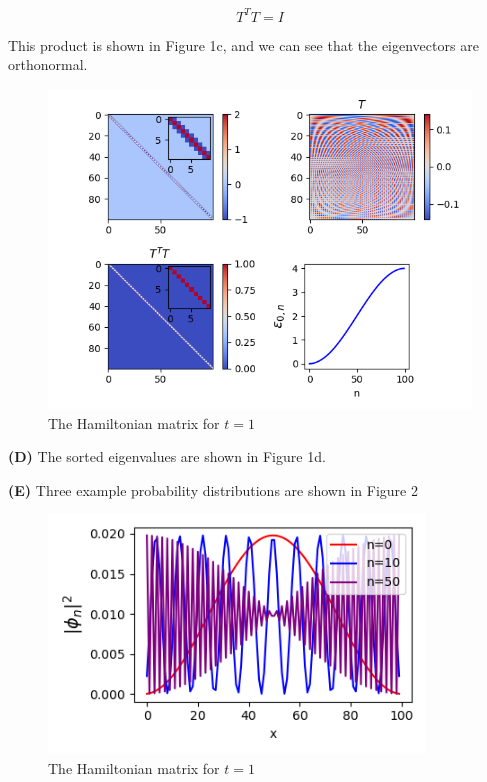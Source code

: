 \documentclass[12pt]{article}
\theoremstyle{definition}
\begin{document}
{\begin{equation*}
T^{T}T = I
\end{equation*}

This product is shown in Figure 1c, and we can see that the eigenvectors are orthonormal.

\begin{figure}[t!]
\centering
\includegraphics[width=15cm]{p1_1}
\caption{The Hamiltonian matrix for $t=1$}
\label{fig:method}
\end{figure}

\vspace{0.1in}
\noindent \textbf{(D)} The sorted eigenvalues are shown in Figure 1d.

\vspace{0.1in}
\noindent \textbf{(E)} Three example probability distributions are shown in Figure 2

\begin{figure}[t!]
\centering
\includegraphics[width=10cm]{p1_2.png}
\caption{The Hamiltonian matrix for $t=1$}
\label{fig:method}
\end{figure}

}
\end{document}
